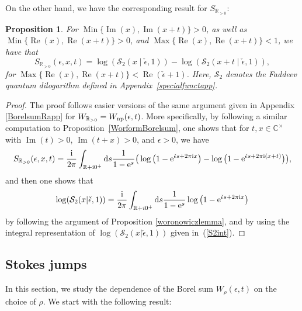 \documentclass[pdftex]{sigma}
\numberwithin{equation}{section}
\newtheorem{Proposition}[Theorem]{Proposition}
 { \theoremstyle{definition}
\newtheorem{Definition}[Theorem]{Definition}
\newtheorem{Note}[Theorem]{Note}
\newtheorem{Example}[Theorem]{Example}
\newtheorem{Remark}[Theorem]{Remark} }
\begin{document}
On the other hand, we have the corresponding result for $S_{\mathbb{R}_{>0}}$:
\begin{Proposition}
For $\operatorname{Min}\{\operatorname{Im}(x),\operatorname{Im}(x+t)\}>0$, as well as $\operatorname{Min}\{\operatorname{Re}(x),\operatorname{Re}(x+t)\}>0$, and $\operatorname{Max}\{\operatorname{Re}(x),\operatorname{Re}(x+t)\}<1$, we have that
\begin{equation*}
 S_{\mathbb{R}_{>0}}(\epsilon,x,t)=\log(\mathcal{S}_2(x\mid \check\epsilon,1))-\log(\mathcal{S}_2(x+t\mid \check\epsilon,1)),
\end{equation*}
for $ \operatorname{Max}\{\operatorname{Re}(x),\operatorname{Re}(x+t)\}<\operatorname{Re}(\check\epsilon+1)$. Here, $\mathcal{S}_2$ denotes the Faddeev quantum dilogarithm defined in Appendix~{\rm \ref{specialfunctapp}}.
\end{Proposition}
\begin{proof}
The proof follows easier versions of the same argument given in Appendix \ref{BorelsumRapp} for $W_{\mathbb{R}_{>0}}=W_{{\rm np}}(\epsilon,t)$. More specifically, by following a similar computation to Proposition~\ref{WorformBorelsum}, one shows that for $t,x\in \mathbb{C}^{\times}$ with $\operatorname{Im}(t)>0$, $\operatorname{Im}(t+x)>0$, and $\epsilon >0$, we have
\begin{equation*}
 S_{\mathbb{R}_{>0}}(\epsilon,x,t)=\frac{\mathrm{i}}{2\pi}\int_{\mathbb{R}+\mathrm{i}0^+}\mathrm{d}s \frac{1}{1-{\rm e}^s} \big(\log\big(1-{\rm e}^{\check\epsilon s+2\pi \mathrm{i} x}\big)-\log\big(1-{\rm e}^{\check\epsilon s+2\pi \mathrm{i}(x+t)}\big)\big),
\end{equation*}
 and then one shows that
\begin{equation*}
 \log(\mathcal{S}_2(x|\check{\epsilon},1))=\frac{\mathrm{i}}{2\pi}\int_{\mathbb{R}+i0^+}\mathrm{d}s \frac{1}{1-{\rm e}^s} \log\big(1-{\rm e}^{\check\epsilon s+2\pi \mathrm{i} x}\big)
\end{equation*}
by following the argument of Proposition \ref{woronowiczlemma}, and by using the integral representation of $\log(\mathcal{S}_2(x|\check\epsilon,1))$ given in~(\ref{S2int}).
\end{proof}

\subsection{Stokes jumps}

In this section, we study the dependence of the Borel sum $W_{\rho}(\epsilon,t)$ on the choice of $\rho$. We start with the following result:
\end{document}
